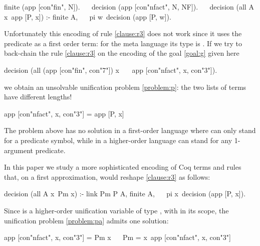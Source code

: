 \documentclass[sigconf,natbib=false,review]{acmart}
\begin{document}
\begin{elpicode}
finite   (app [con"fin", N]).                         ~~
decision (app [con"nfact", N, NF]).                   ~~
decision (all A x\ app [P, x]) :- finite A,           ~~
  pi w\ decision (app [P, w]).
\end{elpicode}

\noindent
Unfortunately this encoding of rule \ref{clause:r3} does not work
since it uses the predicate  as a first order term: for the meta
language its type is . If we try to back-chain the rule
\ref{clause:r3} on the encoding of the goal \ref{goal:g} given here

\begin{elpicode}
decision (all (app [con"fin", con"7"]) x\              ~~
  app [con"nfact", x, con"3"]).
\end{elpicode}

\noindent
we obtain an unsolvable unification problem \ref{problem:p}:
the two lists of terms have different lengths!

\begin{elpicode}
app [con"nfact", x, con"3"] = app [P, x]               ~~
\end{elpicode}

\noindent
The problem above has no solution in a first-order language
where  can only stand for a predicate symbol, while in a higher-order
language  can stand for any 1-argument predicate.

In this paper we study a more sophisticated encoding of Coq terms and rules
that, on a first approximation, would reshape \ref{clause:r3} as follows:

\begin{elpicode}
decision (all A x\ Pm x) :- link Pm P A, finite A,    ~~
  pi x\ decision (app [P, x]).
\end{elpicode}

\noindent
Since  is a higher-order unification variable
of type ,
with 
in its scope, the unification problem \ref{problem:pa}
admits one solution:

\begin{elpicode}
app [con"nfact", x, con"3"] = Pm x                    ~~
Pm = x\ app [con"nfact", x, con"3"]                   ~~
\end{elpicode}
\end{document}
